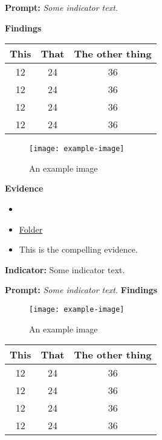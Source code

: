 \documentclass{report}
\begin{document}
\noindent\textbf{Prompt:} \textit{Some indicator text.}

\noindent\textbf{Findings}

\blindtext

\begin{table}[!h]
\begin{tabular}{c | c || c}
This & That & The other thing \\
\hline
12   &  24  &  36 \\
12   &  24  &  36 \\
12   &  24  &  36 \\
12   &  24  &  36 \\
\end{tabular}
\end{table}


\blindtext

\begin{figure}[h!]
\caption[An example image]{An example image}
\centering
\texttt{[image: example-image]}
\end{figure}


\noindent\textbf{Evidence}
\vspace{-\topsep}

\begin{itemize}[leftmargin=*]
\setlength{\parskip}{0pt}
\setlength{\itemsep}{0pt plus 1pt}
\item \blindtext
\item \href{https://drive.google.com/a/cmis.ac.th/folderview?id=0ByVFfrm0zfolWE0yenprdktGVlk&usp=sharing}{Folder}
\item This is the compelling evidence.
\end{itemize}

\noindent\textbf{Indicator:} Some indicator text.

\noindent\textbf{Prompt:} \textit{Some indicator text.}
\noindent\textbf{Findings}

\blindtext

\begin{figure}[h!]
\caption[An example image]{An example image}
\centering
\texttt{[image: example-image]}
\end{figure}


\blindtext

\begin{table}[!h]
\begin{tabular}{c | c || c}
This & That & The other thing \\
\hline
12   &  24  &  36 \\
12   &  24  &  36 \\
12   &  24  &  36 \\
12   &  24  &  36 \\
\end{tabular}
\end{table}
\end{document}
